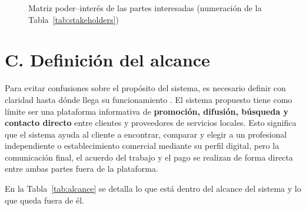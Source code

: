 \documentclass[11pt,a4paper]{article}
\begin{document}
\begin{figure}[H]
\centering
\resizebox{0.86\textwidth}{!}{}
\caption{Matriz poder--inter\'es de las partes interesadas (numeraci\'on de la Tabla~\ref{tab:stakeholders})}
\label{fig:poder-interes}
\end{figure}

\section*{C. Definici\'on del alcance}

Para evitar confusiones sobre el prop\'osito del sistema, es necesario definir con claridad hasta d\'onde llega su funcionamiento \cite{wiegers2013}. El sistema propuesto tiene como l\'imite ser una plataforma informativa de \textbf{promoci\'on, difusi\'on, b\'usqueda y contacto directo} entre clientes y proveedores de servicios locales. Esto significa que el sistema ayuda al cliente a encontrar, comparar y elegir a un profesional independiente o establecimiento comercial mediante su perfil digital, pero la comunicaci\'on final, el acuerdo del trabajo y el pago se realizan de forma directa entre ambas partes fuera de la plataforma.

En la Tabla~\ref{tab:alcance} se detalla lo que est\'a dentro del alcance del sistema y lo que queda fuera de \'el.
\end{document}

